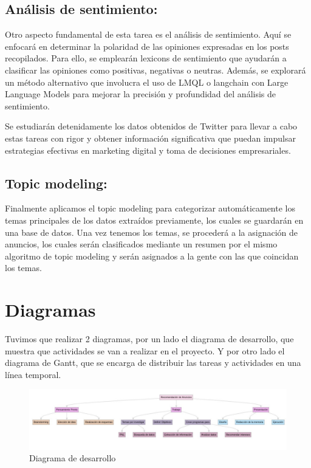 \documentclass[
  letterpaper,
  DIV=11,
  numbers=noendperiod]{scrartcl}
\begin{document}
\subsection{Análisis de sentimiento:}\label{anuxe1lisis-de-sentimiento}

Otro aspecto fundamental de esta tarea es el análisis de sentimiento.
Aquí se enfocará en determinar la polaridad de las opiniones expresadas
en los posts recopilados. Para ello, se emplearán lexicons de
sentimiento que ayudarán a clasificar las opiniones como positivas,
negativas o neutras. Además, se explorará un método alternativo que
involucra el uso de LMQL o langchain con Large Language Models para
mejorar la precisión y profundidad del análisis de sentimiento.

Se estudiarán detenidamente los datos obtenidos de Twitter para llevar a
cabo estas tareas con rigor y obtener información significativa que
puedan impulsar estrategias efectivas en marketing digital y toma de
decisiones empresariales.

\subsection{Topic modeling:}\label{topic-modeling}

Finalmente aplicamos el topic modeling para categorizar automáticamente
los temas principales de los datos extraídos previamente, los cuales se
guardarán en una base de datos. Una vez tenemos los temas, se procederá
a la asignación de anuncios, los cuales serán clasificados mediante un
resumen por el mismo algoritmo de topic modeling y serán asignados a la
gente con las que coincidan los temas.

\newpage{}

\section{Diagramas}\label{diagramas}

Tuvimos que realizar 2 diagramas, por un lado el diagrama de desarrollo,
que muestra que actividades se van a realizar en el proyecto. Y por otro
lado el diagrama de Gantt, que se encarga de distribuir las tareas y
actividades en una línea temporal.

\begin{figure}[H]

{\centering \includegraphics{diagrama de desarrollo.png}

}

\caption{Diagrama de desarrollo}

\end{figure}%
\end{document}

